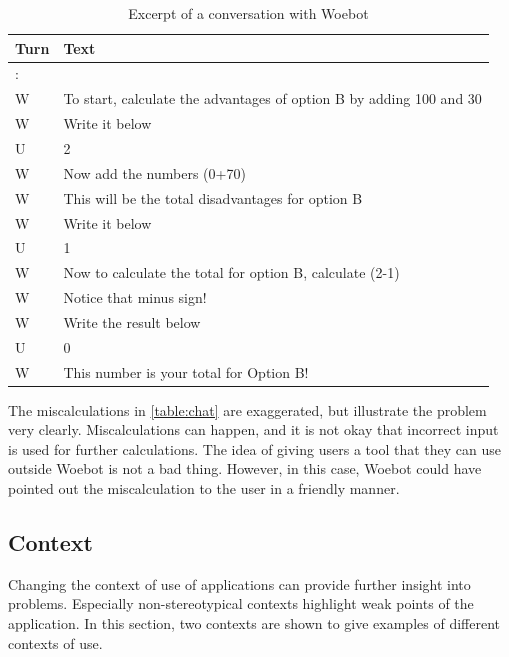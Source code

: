 \begin{table}[ht]
    \begin{tabularx}{\columnwidth}{l X}
        \hline
        Turn & Text                                                                \\
        \hline
        :    &                                                                     \\
        W    & To start, calculate the advantages of option B by adding 100 and 30 \\
        W    & Write it below                                                      \\
        U    & 2                                                                   \\
        W    & Now add the numbers (0+70)                                          \\
        W    & This will be the total disadvantages for option B                   \\
        W    & Write it below                                                      \\
        U    & 1                                                                   \\
        W    & Now to calculate the total for option B, calculate (2-1)            \\
        W    & Notice that minus sign!                                             \\
        W    & Write the result below                                              \\
        U    & 0                                                                   \\
        W    & This number is your total for Option B!                             \\
    \end{tabularx}
    \caption{Excerpt of a conversation with Woebot}
    \label{table:chat}
\end{table}

The miscalculations in \autoref{table:chat} are exaggerated, but illustrate the problem very clearly.
Miscalculations can happen, and it is not okay that incorrect input is used for further calculations.
The idea of giving users a tool that they can use outside Woebot is not a bad thing.
However, in this case, Woebot could have pointed out the miscalculation to the user in a friendly manner.

\subsection{Context}
Changing the context of use of applications can provide further insight into problems.
Especially non-stereotypical contexts highlight weak points of the application.
In this section, two contexts are shown to give examples of different contexts of use.\\


